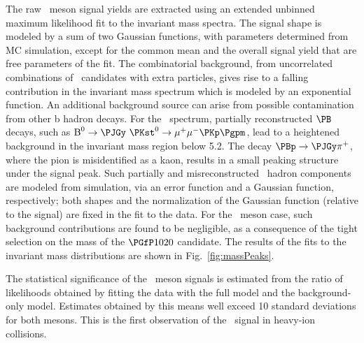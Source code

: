 The raw \PB\ meson signal yields are extracted using an extended unbinned maximum likelihood fit to the invariant mass spectra. %
%
The signal shape is modeled by a sum of two Gaussian functions, with parameters determined from MC simulation, except for the common mean and the overall signal yield that are free parameters of the fit.
The combinatorial background, from uncorrelated combinations of \PJGy\ candidates with extra particles,
gives rise to a falling contribution in the invariant mass spectrum which is modeled by an exponential function.
An additional background source can arise from possible contamination from other b hadron decays.
For the \PBp\ spectrum, partially reconstructed $\PB$ decays, such as ${\text{B}}^{0} \to \PJGy~\PKst^0 \to \mu^{+}\mu^{-}\PKp\Pgpm$, lead to a heightened background in the invariant mass region below 5.2\GeVcc.
The decay $\PBp \rightarrow \PJGy \pi^{+}$, where the pion is misidentified as a kaon, results in a small peaking structure under the signal peak.
Such partially and misreconstructed \PB\ hadron components are modeled from simulation, via an error function and a Gaussian function, respectively; both shapes and the normalization of the Gaussian function (relative to the signal) are fixed in the fit to the data.   
For the \PBzs\ meson case, such background contributions are found to be negligible, as a consequence of the tight selection on the mass of the $\Pphi$ candidate.
%
%
The results of the fits to the invariant mass distributions are shown in Fig.~\ref{fig:massPeaks}.

The statistical significance of the \PB\ meson signals is estimated from the ratio of likelihoods obtained by fitting the data with the full model and the background-only model. Estimates obtained by this means well exceed 10 standard deviations for both mesons.  
This is the first observation of the \PBzs\ signal in heavy-ion collisions. 

